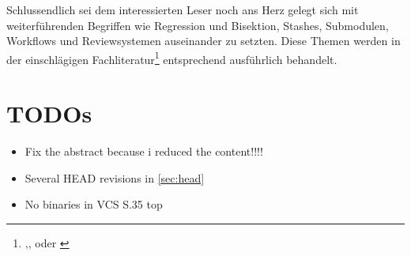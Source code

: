 Schlussendlich sei dem interessierten Leser noch ans Herz gelegt sich mit
weiterführenden Begriffen wie Regression und Bisektion, Stashes, Submodulen,
Workflows und Reviewsystemen auseinander zu setzten. Diese Themen werden in der
einschlägigen Fachliteratur\footnote{\cite{gitosp},\cite{progit},\cite{gitwf}
oder \cite{cd}} entsprechend ausführlich behandelt.

\chapter{TODOs}
\begin{itemize}
\item Fix the abstract because i reduced the content!!!!
\item Several HEAD revisions in \ref{sec:head}
\item No binaries in VCS S.35 top
\end{itemize}
